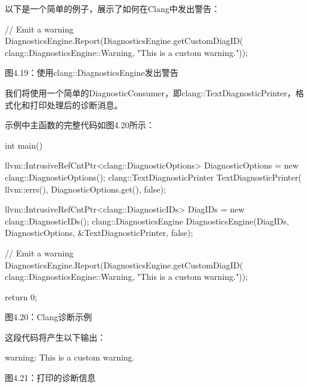 以下是一个简单的例子，展示了如何在Clang中发出警告：

\begin{cpp}
// Emit a warning
DiagnosticsEngine.Report(DiagnosticsEngine.getCustomDiagID(
  clang::DiagnosticsEngine::Warning, "This is a custom warning."));
\end{cpp}

\begin{center}
图4.19：使用clang::DiagnosticsEngine发出警告
\end{center}

我们将使用一个简单的DiagnosticConsumer，即clang::TextDiagnosticPrinter，格式化和打印处理后的诊断消息。

示例中主函数的完整代码如图4.20所示：

\begin{cpp}
int main() {
  llvm::IntrusiveRefCntPtr<clang::DiagnosticOptions> DiagnosticOptions =
    new clang::DiagnosticOptions();
  clang::TextDiagnosticPrinter TextDiagnosticPrinter(
    llvm::errs(), DiagnosticOptions.get(), false);

  llvm::IntrusiveRefCntPtr<clang::DiagnosticIDs> DiagIDs =
    new clang::DiagnosticIDs();
  clang::DiagnosticsEngine DiagnosticsEngine(DiagIDs, DiagnosticOptions,
                                             &TextDiagnosticPrinter, false);

  // Emit a warning
  DiagnosticsEngine.Report(DiagnosticsEngine.getCustomDiagID(
    clang::DiagnosticsEngine::Warning, "This is a custom warning."));

  return 0;
}
\end{cpp}

\begin{center}
图4.20：Clang诊断示例
\end{center}

这段代码将产生以下输出：

\begin{shell}
warning: This is a custom warning.
\end{shell}

\begin{center}
图4.21：打印的诊断信息
\end{center}

